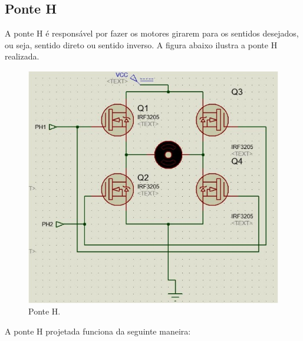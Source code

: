 \subsection{Ponte H}

A ponte H é responsável por fazer os motores girarem para os sentidos desejados, ou seja, sentido direto ou sentido inverso. A figura abaixo ilustra a ponte H realizada.

\begin{figure}[h!]
  \centering
  \includegraphics{figuras/Ponte_H.jpg}
  \caption{Ponte H.}
\end{figure}

A ponte H projetada funciona da seguinte maneira: 

